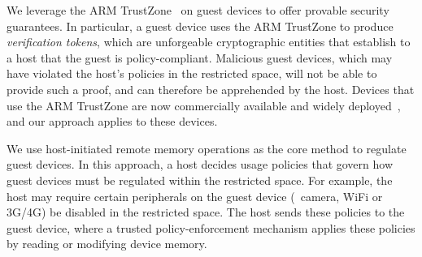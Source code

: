 \begin{mylist}
%
\item {} We leverage the ARM
TrustZone~\cite{armtz} on guest devices to offer provable security guarantees.
In particular, a guest device uses the ARM TrustZone to produce
\textit{verification tokens}, which are unforgeable cryptographic entities that
establish to a host that the guest is policy-compliant.  Malicious guest
devices, which may have violated the host's policies in the restricted space,
will not be able to provide such a proof, and can therefore be apprehended by
the host. Devices that use the ARM TrustZone are now commercially available and
widely deployed~\cite{knox:ccs14}, and our approach applies to these devices.
%
\item {} We use host-initiated remote memory
operations as the core method to regulate guest devices. In this approach, a
host decides usage policies that govern how guest devices must be regulated
within the restricted space. For example, the host may require certain
peripherals on the guest device (\eg~camera, WiFi or 3G/4G) be disabled in the
restricted space. The host sends these policies to the guest device, where a
trusted policy-enforcement mechanism applies these policies by reading or
modifying device memory. 


\end{mylist}
